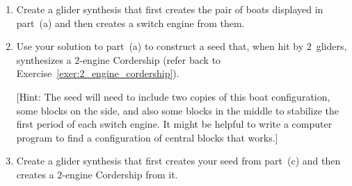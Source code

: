 \begin{multicols}{2}
\begin{problemstar}
\begin{enumerate}[label=\bf\color{ocre}(\alph*)]
			\item {} Create a glider synthesis that first creates the pair of boats displayed in part~(a) and then creates a switch engine from them.
			
			\item {} Use your solution to part~(a) to construct a seed that, when hit by $2$~gliders, synthesizes a $2$-engine Cordership (refer back to Exercise~\ref{exer:2_engine_cordership}).
			
			[Hint: The seed will need to include two copies of this boat configuration, some blocks on the side, and also some blocks in the middle to stabilize the first period of each switch engine. It might be helpful to write a computer program to find a configuration of central blocks that works.]
			
			\item {} Create a glider synthesis that first creates your seed from part~(c) and then creates a $2$-engine Cordership from it.
		\end{enumerate}
	\end{problemstar}
	
	
	
	
\end{multicols}
\normalsize\vspace*{0.01cm}
